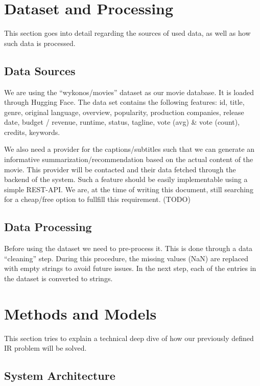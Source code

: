 \documentclass[11pt,a4paper]{article}
\begin{document}
  \section{Dataset and Processing}

  This section goes into detail regarding the sources of used data, as well as how such data is processed.

  \subsection{Data Sources}

  We are using the ``wykonos/movies'' dataset as our movie database.
  It is loaded through Hugging Face.
  The data set contains the following features:
  id, title, genre, original language, overview, popularity, production companies, release date, budget / revenue, runtime, status, tagline, vote (avg) \& vote (count), credits, keywords.

  We also need a provider for the captions/subtitles such that we can generate an informative summarization/recommendation based on the actual content of the movie.
  This provider will be contacted and their data fetched through the backend of the system.
  Such a feature should be easily implementable using a simple REST-API.
  We are, at the time of writing this document, still searching for a cheap/free option to fullfill this requirement. (TODO)

  \subsection{Data Processing}

  Before using the dataset we need to pre-process it.
  This is done through a data ``cleaning'' step.
  During this procedure, the missing values (NaN) are replaced with empty strings to avoid future issues.
  In the next step, each of the entries in the dataset is converted to strings.

  \section{Methods and Models}

  This section tries to explain a technical deep dive of how our previously defined IR problem will be solved.

  \subsection{System Architecture}
\end{document}
